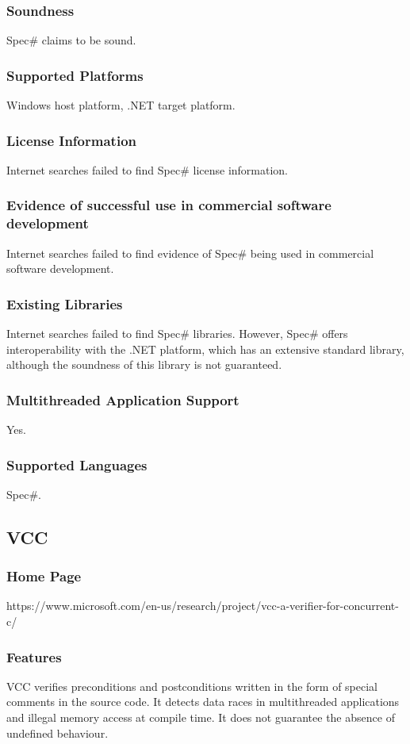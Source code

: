 \documentclass[11pt]{article}
\begin{document}
	\subsubsection{Soundness}
		Spec\# claims to be sound\cite{BarnettMike2005TSPS}.
	\subsubsection{Supported Platforms}
		Windows host platform, .NET target platform.
	\subsubsection{License Information}
		Internet searches failed to find Spec\# license information.
	\subsubsection{Evidence of successful use in commercial software development}
		Internet searches failed to find evidence of Spec\# being used in commercial software development.
	\subsubsection{Existing Libraries}
		Internet searches failed to find Spec\# libraries. However, Spec\# offers interoperability with the .NET platform, which has an extensive standard library, although the soundness of this library is not guaranteed.
	\subsubsection{Multithreaded Application Support}
		Yes\cite{spec01}.
	\subsubsection{Supported Languages}
		Spec\#.









\subsection{VCC}
	\subsubsection{Home Page}%
		https://www.microsoft.com/en-us/research/project/vcc-a-verifier-for-concurrent-c/	
	\subsubsection{Features}
	VCC verifies preconditions and postconditions written in the form of special comments in the source code. 		It detects data races in multithreaded applications and illegal memory access at compile time. It does not 		guarantee the absence of undefined behaviour.
\end{document}
